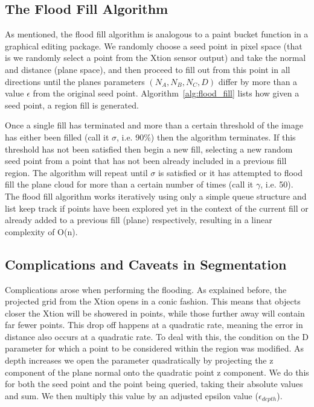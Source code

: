 \documentclass[]{article}
\begin{document}
{\subsection{The Flood Fill Algorithm}
As mentioned, the flood fill algorithm is analogous to a paint bucket function in a graphical editing package. We randomly choose a seed point in pixel space (that is we randomly select a point from the Xtion sensor output) and take the normal and distance (plane space), and then proceed to fill out from this point in all directions until the planes parameters $(N_A, N_B, N_C, D)$ differ by more than a value $\epsilon$ from the original seed point. Algorithm~\ref{alg:flood_fill} lists how given a seed point, a region fill is generated.

Once a single fill has terminated and more than a certain threshold of the image has either been filled (call it $\sigma$, i.e. 90\%) then the algorithm terminates. If this threshold has not been satisfied then begin a new fill, selecting a new random seed point from a point that has not been already included in a previous fill region. The algorithm will repeat until $\sigma$ is satisfied or it has attempted to flood fill the plane cloud for more than a certain number of times (call it $\gamma$, i.e. 50). The flood fill algorithm works iteratively using only a simple queue structure and list keep track if points have been explored yet in the context of the current fill or already added to a previous fill (plane) respectively, resulting in a linear complexity of O(n). 


\subsection{Complications and Caveats in Segmentation} %
\label{sub:complications_in_the_segmentation_algorithm}


Complications arose when performing the flooding. As explained before, the projected grid from the Xtion opens in a conic fashion. This means that objects closer the Xtion will be showered in points, while those further away will contain far fewer points. This drop off happens at a quadratic rate, meaning the error in distance also occurs at a quadratic rate. To deal with this, the condition on the D parameter for which a point to be considered within the region was modified. As depth increases we open the parameter quadratically by projecting the z component of the plane normal onto the quadratic point z component. We do this for both the seed point and the point being queried, taking their absolute values and sum. We then multiply this value by an adjusted epsilon value ($\epsilon_{depth}$). 


}
\end{document}
